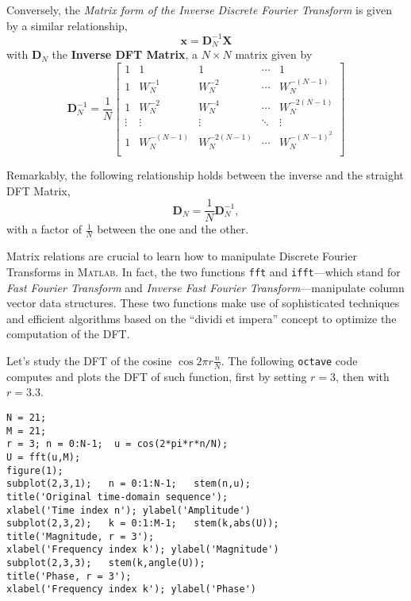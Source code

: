 \documentclass[\documentfontsize, twocolumn]{\classname}
\begin{document}
Conversely, the \emph{Matrix form of the Inverse Discrete Fourier Transform} is given by a similar relationship,
\begin{equation}\label{eqn:idftMatrixForm}
    \bm{x} = \bm{D}^{-1}_N\bm{X}
\end{equation}
with $\bm D_N$ the \textbf{Inverse DFT Matrix}, a $N \times N$ matrix given by
\begin{equation}\label{eqn:idftMatrixDn}
    \bm D^{-1}_N = \frac 1 N\begin{bmatrix}
        1 & 1 & 1 & \cdots & 1 \\
        1 & W_N^{-1} & W_N^{-2} & \cdots & W_N^{-(N-1)} \\
        1 & W_N^{-2} & W_N^{-4} & \cdots & W_N^{-2(N-1)} \\
        \vdots & \vdots & \vdots & \ddots & \vdots \\
        1 & W_N^{-(N-1)} & W_N^{-2(N-1)} & \cdots & W_N^{-(N-1)^2} \\
    \end{bmatrix}
\end{equation}

Remarkably, the following relationship holds between the inverse and the straight DFT Matrix,
\[
    \bm D_N = \frac 1 N \bm D^{-1}_N,
\]
with a factor of $\frac 1 N$ between the one and the other.

Matrix relations are crucial to learn how to manipulate Discrete Fourier Transforms in \textsc{Matlab}. In fact, the two functions \texttt{fft} and \texttt{ifft}---which stand for \emph{Fast Fourier Transform} and \emph{Inverse Fast Fourier Transform}---manipulate column vector data structures. These two functions make use of sophisticated techniques and efficient algorithms based on the ``dividi et impera'' concept to optimize the computation of the DFT.

Let's study the DFT of the cosine $\cos{2\pi r \frac{n}{N}}$. The following \texttt{octave} code computes and plots the DFT of such function, first by setting $r=3$, then with $r=3.3$.
\begin{verbatim}
N = 21;
M = 21;
r = 3; n = 0:N-1;  u = cos(2*pi*r*n/N);
U = fft(u,M);
figure(1);
subplot(2,3,1);   n = 0:1:N-1;   stem(n,u);
title('Original time-domain sequence');
xlabel('Time index n'); ylabel('Amplitude')
subplot(2,3,2);   k = 0:1:M-1;   stem(k,abs(U));
title('Magnitude, r = 3');
xlabel('Frequency index k'); ylabel('Magnitude')
subplot(2,3,3);   stem(k,angle(U));
title('Phase, r = 3');
xlabel('Frequency index k'); ylabel('Phase')
\end{verbatim}
\end{document}
